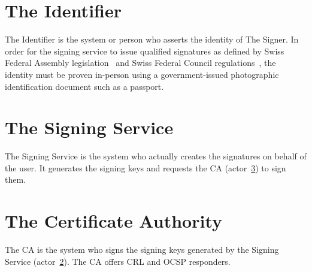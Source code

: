 \section{The Identifier}
\label{sec:authoridentifier}
The Identifier is the system or person who asserts the identity of The Signer.
In order for the signing service to issue qualified signatures as defined by Swiss Federal Assembly legislation~\cite{zertes} and Swiss Federal Council regulations~\cite{vzertes},
the identity must be proven in-person using a government-issued photographic identification document such as a passport.

\section{The Signing Service}
\label{sec:actorsigningservice}
The Signing Service is the system who actually creates the signatures on behalf of the user.
It generates the signing keys and requests the \gls{CA} (actor~\ref{sec:actorca}) to sign them.

\section{The Certificate Authority}
\label{sec:actorca}
The \gls{CA} is the system who signs the signing keys generated by the Signing Service (actor~\ref{sec:actorsigningservice}).
The \gls{CA} offers \gls{CRL} and \gls{OCSP} responders.
